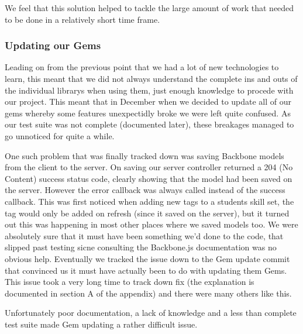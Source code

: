     We feel that this solution helped to tackle the large amount of work that needed to be done in a relatively short time frame.
  \subsubsection{Updating our Gems}
    Leading on from the previous point that we had a lot of new technologies to learn, this meant that we did not always understand the complete ins and outs of the individual librarys when using them, just enough knowledge to procede with our project. This meant that in December when we decided to update all of our gems whereby some features unexpectidly broke we were left quite confused. As our test suite was not complete (documented later), these breakages managed to go unnoticed for quite a while.

    One such problem that was finally tracked down was saving Backbone models from the client to the server. On saving our server controller returned a 204 (No Content) success status code, clearly showing that the model had been saved on the server. However the error callback was always called instead of the success callback. This was first noticed when adding new tags to a students skill set, the tag would only be added on refresh (since it saved on the server), but it turned out this was happening in most other places where we saved models too.
    We were absolutely sure that it must have been something we'd done to the code, that slipped past testing sicne consulting the Backbone.js documentation was no obvious help. Eventually we tracked the issue down to the Gem update commit that convinced us it must have actually been to do with updating them Gems.
    This issue took a very long time to track down fix (the explanation is documented in section A of the appendix) and there were many others like this.

    Unfortunately poor documentation, a lack of knowledge and a less than complete test suite made Gem updating a rather difficult issue.
